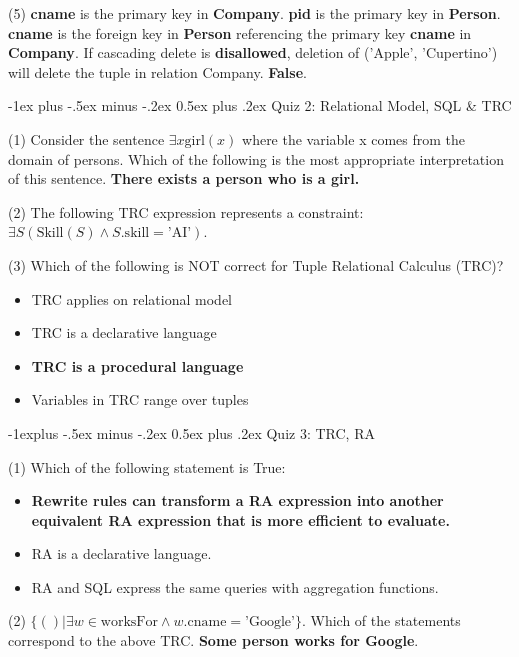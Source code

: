 \documentclass[10pt,landscape]{article}
\makeatletter
\newcommand{\term}[1]{{\color{blue} \textbf{#1}}}
\newcommand{\prpt}[1]{{\color{red} \textbf{#1}}}
\newcommand{\sql}[1]{{\color{cyan} \textbf{#1}}}
\newcommand{\ans}[1]{{\color{purple} \textbf{#1}}}
\renewcommand{\section}{\@startsection{section}{1}{0mm}%
                                {-1ex plus -.5ex minus -.2ex}%
                                {0.5ex plus .2ex}%
                                {\normalfont\large\bfseries}}
\renewcommand{\subsection}{\@startsection{subsection}{2}{0mm}%
                                {-1explus -.5ex minus -.2ex}%
                                {0.5ex plus .2ex}%
                                {\normalfont\normalsize\bfseries}}
\makeatother
\begin{document}
\begin{multicols}{4}
(5) \sql{cname} is the primary key in \sql{Company}.\sql{pid} is the primary key in \sql{Person}.\sql{cname} is the foreign key in \sql{Person} referencing the primary key \sql{cname} in \sql{Company}. If cascading delete is \prpt{disallowed}, deletion of ('Apple', 'Cupertino') will delete the tuple in relation Company. \ans{False}.

\section{Quiz 2: Relational Model, SQL \& TRC}

(1) Consider the sentence $\exists x \text{girl}(x)$ where the variable x comes from the domain of persons. Which of the following is the most appropriate interpretation of this sentence. \ans{There exists a person who is a girl.}

(2) The following TRC expression represents a constraint: $\exists S (\text{Skill}(S) \land S.\text{skill} = \text{'AI'})$.

(3) Which of the following is NOT correct for Tuple Relational Calculus (TRC)?

\begin{itemize}
	\item TRC applies on relational model 
	\item TRC is a declarative language 
	\item \ans{TRC is a procedural language}
	\item Variables in TRC range over tuples 
\end{itemize}

\subsection{Quiz 3: TRC, RA}

(1) Which of the following statement is True:

\begin{itemize}
	\item \ans{Rewrite rules can transform a RA expression into another equivalent RA expression that is more efficient to evaluate.}
	\item RA is a declarative language.
	\item RA and SQL express the same queries with aggregation functions.
\end{itemize}

(2) \term{$\{() | \exists w \in  \text{worksFor} \land w.\text{cname} = \text{'Google'} \}$}. Which of the statements correspond to the above TRC. \ans{Some person works for Google}.


\end{multicols}
\end{document}
